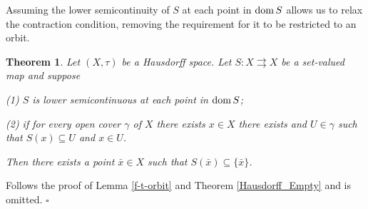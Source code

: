 \documentclass{article}
\def\dom{\mathop{\rm dom}}
\renewcommand{\emptyset}{\varnothing}
\def\dom{\mathop{\rm dom}}
\def\dom{\mathop{\rm dom}}
\def\text#1{\,\;\hbox{#1}\;\,}
\renewenvironment{proof}
         {\begin{trivlist}\item[
         {\bf Proof.}]}{{\hfill $\square$} \end{trivlist}}
\newtheorem{theo}{Theorem}[section]
\begin{document}

    
Assuming the lower semicontinuity of $S$ at each point in $\dom S$ allows us to relax the contraction condition, removing the requirement for it to be restricted to an orbit.
\begin{theo} \label{f-t-contractive_global}
Let $(X, \tau)$ be a Hausdorff space. Let $S: X \rightrightarrows X$ be a set-valued map and suppose 

(1) $S$ is lower semicontinuous at each point in $\dom S$;

(2) if for every open cover $\gamma$ of $X$ there exists $x \in X$ there exists and $U \in \gamma$ such that $S(x) \subseteq U$ and $x \in U$. 

Then there exists a point $\bar{x} \in X$ such that $S(\bar{x}) \subseteq \{\bar{x}\}$.
\end{theo}
\begin{proof} Follows the proof of Lemma \ref{f-t-orbit} and Theorem \ref{Hausdorff_Empty} and is omitted.
\end{proof}
\end{document}

